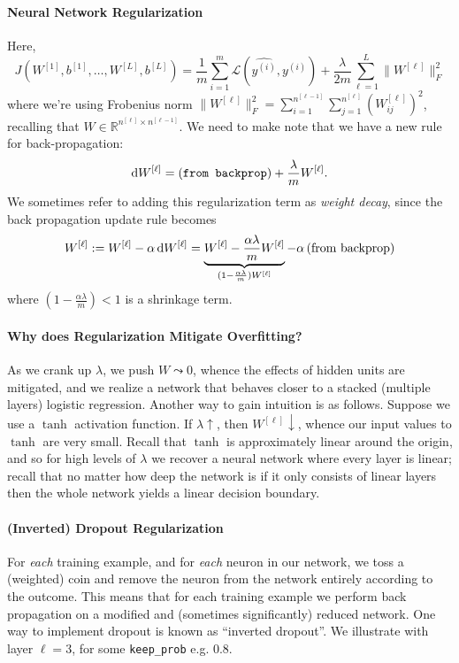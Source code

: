 \documentclass[12pt]{article}
\begin{document}
\paragraph{Neural Network Regularization} Here,
\[
J\left(W^{[1]}, b^{[1]}, \ldots, W^{[L]}, b^{[L]}\right) = \frac{1}{m} \sum_{i=1}^{m} \mathcal L(\hat {y^{(i)}}, y^{(i)}) + \frac{\lambda}{2m} \sum_{\ell=1}^{L} \|W^{[\ell]}\|_F^2
\]
where we're using Frobenius norm $\|W^{[\ell]}\|_F^2 = \sum_{i=1}^{n^{[\ell-1]}} \sum_{j=1}^{n^{[\ell]}} (W_{ij}^{[\ell]})^2$, recalling that $W \in \mathbb R^{n^{[\ell]} \times n^{[\ell - 1]}}$. We need to make note that we have a new rule for back-propagation:
\[
\operatorname{d}\!{W}^{[\ell]} = \left(\texttt{from backprop}\right) + \frac{\lambda}{m} W^{[\ell]}.
\]
We sometimes refer to adding this regularization term as \emph{weight decay}, since the back propagation update rule becomes
\[
W^{[\ell]} := W^{[\ell]} - \alpha \operatorname{d}\!{W}^{[\ell]} = \underbrace{W^{[\ell]} - \frac{\alpha \lambda}{m} W^{[\ell]}}_{(1-\frac{\alpha \lambda}{m})W^{[\ell]}} - \alpha \left(\textrm{from backprop}\right)
\]
where $(1-\frac{\alpha \lambda}{m}) < 1$ is a shrinkage term.

\paragraph{Why does Regularization Mitigate Overfitting?} As we crank up $\lambda$, we push $W \leadsto 0$, whence the effects of hidden units are mitigated, and we realize a network that behaves closer to a stacked (multiple layers) logistic regression. 
Another way to gain intuition is as follows. Suppose we use a $\tanh$ activation function. If $\lambda \uparrow$, then $W^{[\ell]} \downarrow$, whence our input values to $\tanh$ are very small. Recall that $\tanh$ is approximately linear around the origin, and so for high levels of $\lambda$ we recover a neural network where every layer is linear; recall that no matter how deep the network is if it only consists of linear layers then the whole network yields a linear decision boundary.

\paragraph{(Inverted) Dropout Regularization} For \emph{each} training example, and for \emph{each} neuron in our network, we toss a (weighted) coin and remove the neuron from the network entirely according to the 
outcome. This means that for each training example we perform back propagation on a modified and (sometimes significantly) 
reduced network.
One way to implement dropout is known as ``inverted dropout''. We illustrate with layer $\ell = 3$, for some \texttt{keep\_prob} 
e.g. 0.8.
\end{document}
